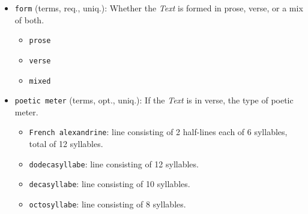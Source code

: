 \begin{itemize}
\begin{multicols}{2}
\begin{itemize}
            \item \texttt{ita}: Italian
            \item \texttt{mga}: Middle Irish (900-1200)
            \item \texttt{non}: Old Norse
            \item \href{https://www.wikidata.org/wiki/Q12330003}{\texttt{non\_DAN}}: Old East Norse, Old Danish (800-1100)
            \item \href{https://www.wikidata.org/wiki/Q2417210}{\texttt{non\_SWE}}: Old Swedish (800-1500)
            \item \texttt{oco}: Old Cornish
            \item \texttt{por}: Portugese
            \item \texttt{pro}: Old Occitan, Old Provençal (to 1500)
            \item \texttt{spa}: Spanish or Castilian
            \item \texttt{wlm}: Middle Welsh
            \item \href{https://data.biblissima.fr/w/Item:Q286307}{\texttt{xno}}: Anglo-French, Anglo-Norman
        \end{itemize}
    \end{multicols}
    \item \texttt{form} (terms, req., uniq.): Whether the \textit{Text} is formed in prose, verse, or a mix of both.
    \begin{multicols}{4}
        \begin{itemize}
            \item \texttt{prose}
            \item \texttt{verse}
            \item \texttt{mixed}
        \end{itemize}
    \end{multicols}
    \item \texttt{poetic meter} (terms, opt., uniq.): If the \textit{Text} is in verse, the type of poetic meter.
        \begin{itemize}
            \item \texttt{French alexandrine}: line consisting of 2 half-lines each of 6 syllables, total of 12 syllables.
            \item \texttt{dodecasyllabe}: line consisting of 12 syllables.
            \item \texttt{decasyllabe}: line consisting of 10 syllables.
            \item \texttt{octosyllabe}: line consisting of 8 syllables.

\end{itemize}
\end{itemize}
